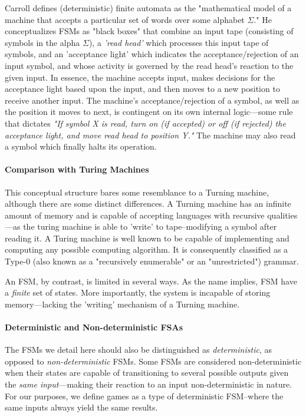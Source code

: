 \documentclass{report}
\begin{document}
Carroll defines (deterministic) finite automata as the "mathematical model of a machine that accepts a particular set of words over some alphabet $\Sigma$.\cite{FSM}" He conceptualizes FSMs as "black boxes" that combine an input tape (consisting of symbols in the alpha $\Sigma$), a \emph{'read head'} which processes this input tape of symbols, and an 'acceptance light' which indicates the acceptance/rejection of an input symbol, and whose activity is governed by the read head's reaction to the given input. In essence, the machine accepts input, makes decisions for the acceptance light based upon the input, and then moves to a new position to receive another input. The machine's acceptance/rejection of a symbol, as well as the position it moves to next, is contingent on its own internal logic---some rule that dictates \emph{"If symbol X is read, turn on (if accepted) or off (if rejected) the acceptance light, and move read head to position Y."} The machine may also read a symbol which finally halts its operation.

\paragraph{Comparison with Turing Machines}

This conceptual structure bares some resemblance to a Turning machine\cite{Turing}, although there are some distinct differences. A Turning machine has an infinite amount of memory and is capable of accepting languages with recursive qualities---as the turing machine is able to 'write' to tape--modifying a symbol after reading it. A Turing machine is well known to be capable of implementing and computing any possible computing algorithm\cite{Turing_2004}. It is consequently classified as a Type-0 (also known as a "recursively enumerable" or an "unrestricted") grammar.

An FSM, by contrast, is limited in several ways. As the name implies, FSM have a \emph{finite} set of states. More importantly, the system is incapable of storing memory---lacking the 'writing' mechanism of a Turning machine\cite{FSM}. 

\paragraph{Deterministic and Non-deterministic FSAs}

The FSMs we detail here should also be distinguished as \emph{deterministic}, as opposed to \emph{non-deterministic} FSMs. Some FSMs are considered non-deterministic when their states are capable of transitioning to several possible outputs given the \emph{same input}---making their reaction to an input non-deterministic in nature\cite{NDFSA}. For our purposes, we define games as a type of deterministic FSM--where the same inputs always yield the same results. 
\end{document}
